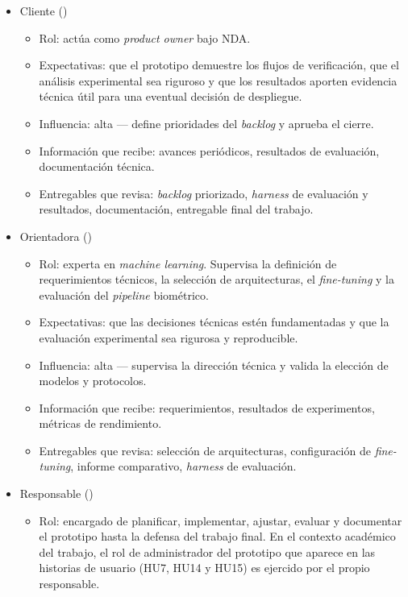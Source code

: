 \documentclass[
  11pt, %
]{charter}
\begin{document}
\begin{itemize}
  \item Cliente (\clientename)
    \begin{itemize}
      \item Rol: actúa como \textit{product owner} bajo NDA.
      \item Expectativas: que el prototipo demuestre los flujos de verificación, que el análisis experimental sea riguroso y que los resultados aporten evidencia técnica útil para una eventual decisión de despliegue.
      \item Influencia: alta --- define prioridades del \textit{backlog} y aprueba el cierre.
      \item Información que recibe: avances periódicos, resultados de evaluación, documentación técnica.
      \item Entregables que revisa: \textit{backlog} priorizado, \textit{harness} de evaluación y resultados, documentación, entregable final del trabajo.
    \end{itemize}
  \item Orientadora (\supname)
    \begin{itemize}
      \item Rol: experta en \textit{machine learning}. Supervisa la definición de requerimientos técnicos, la selección de arquitecturas, el \textit{fine-tuning} y la evaluación del \textit{pipeline} biométrico.
      \item Expectativas: que las decisiones técnicas estén fundamentadas y que la evaluación experimental sea rigurosa y reproducible.
      \item Influencia: alta --- supervisa la dirección técnica y valida la elección de modelos y protocolos.
      \item Información que recibe: requerimientos, resultados de experimentos, métricas de rendimiento.
      \item Entregables que revisa: selección de arquitecturas, configuración de \textit{fine-tuning}, informe comparativo, \textit{harness} de evaluación.
    \end{itemize}
  \item Responsable (\authorname)
    \begin{itemize}
      \item Rol: encargado de planificar, implementar, ajustar, evaluar y documentar el prototipo hasta la defensa del trabajo final. En el contexto académico del trabajo, el rol de administrador del prototipo que aparece en las historias de usuario (HU7, HU14 y HU15) es ejercido por el propio responsable.

\end{itemize}
\end{itemize}
\end{document}
